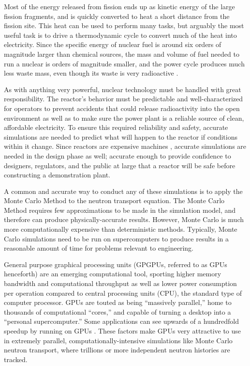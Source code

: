 Most of the energy released from fission ends up as kinetic energy of the large fission fragments, and is quickly converted to heat a short distance from the fission site.  This heat can be used to perform many tasks, but arguably the most useful task is to drive a thermodynamic cycle to convert much of the heat into electricity.  Since the specific energy of nuclear fuel is around six orders of magnitude larger than chemical sources, the mass and volume of fuel needed to run a nuclear is orders of magnitude smaller, and the power cycle produces much less waste mass, even though its waste is very radioactive \cite{waste_mass}.  

As with anything very powerful, nuclear technology must be handled with great responsibility.  The reactor's behavior must be predictable and well-characterized for operators to prevent accidents that could release radioactivity into the open environment as well as to make sure the power plant is a reliable source of clean, affordable electricity.  To ensure this required reliability and safety, accurate simulations are needed to predict what will happen to the reactor if conditions within it change.  Since reactors are  expensive machines \cite{nuclear_cost}, accurate simulations are needed in the design phase as well; accurate enough to provide confidence to designers, regulators, and the public at large that a reactor will be safe before constructing a demonstration plant.  

A common and accurate way to conduct any of these simulations is to apply the Monte Carlo Method to the neutron transport equation.  The Monte Carlo Method requires few approximations to be made in the simulation model, and therefore can produce physically-accurate results.  However, Monte Carlo is much more computationally expensive than deterministic methods.  Typically, Monte Carlo simulations need to be run on supercomputers to produce results in a reasonable amount of time for problems relevant to engineering.

General purpose graphical processing units (GPGPUs, referred to as GPUs henceforth) are an emerging computational tool, sporting higher memory bandwidth and computational throughput as well as lower power consumption per operation compared to central processing units (CPU), the standard type of computer processor.  GPUs are touted as being ``massively parallel,'' home to thousands of computational ``cores,'' and capable of turning a desktop into a ``personal supercomputer.''  Some applications can see upwards of a hundredfold speedup by running on GPUs \cite{nvidia_speedups}. These factors make GPUs very attractive to use in extremely parallel, computationally-intensive simulations like Monte Carlo neutron transport, where trillions or more independent neutron histories are tracked.   

